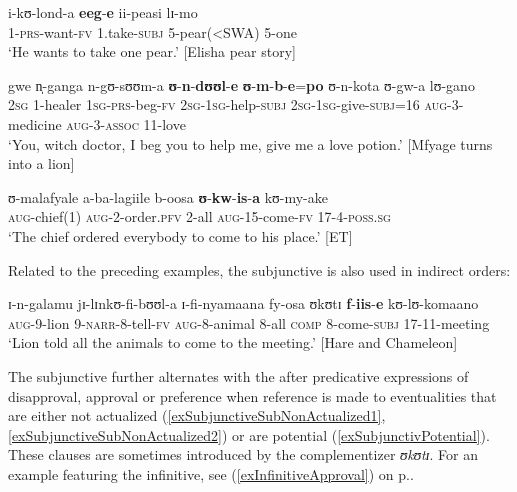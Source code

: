 \begin{exe}
\ex \label{exSubjunctiveModalitySameSubject}
\gll i-kʊ-lond-a \textbf{eeg}-\textbf{e} ii-peasi lɪ-mo\\
1-\textsc{prs}-want-\textsc{fv} 1.take-\textsc{subj} 5-pear(<SWA) 5-one\\
\glt \lq He wants to take one pear.' [Elisha pear story]

\largerpage
\ex \label{exSubjunctiveModalityDifferentSubject}
\gll gwe n̩-ganga n-gʊ-sʊʊm-a \textbf{ʊ}-\textbf{n}-\textbf{dʊʊl}-\textbf{e} \textbf{ʊ}-\textbf{m}-\textbf{b}-\textbf{e}=\textbf{po} ʊ-n-kota ʊ-gw-a lʊ-gano\\
\textsc{2sg} 1-healer \textsc{1sg}-\textsc{prs}-beg-\textsc{fv} \textsc{2sg}-\textsc{1sg}-help-\textsc{subj} \textsc{2sg}-\textsc{1sg}-give-\textsc{subj}=16 \textsc{aug}-3-medicine \textsc{aug}-3-\textsc{assoc} 11-love\\
\glt \lq You, witch doctor, I beg you to help me, give me a love potion.' [Mfyage turns into a lion] 

\ex \label{exInfinitiveModalityDifferentSubject}
\gll ʊ-malafyale a-ba-lagiile b-oosa \textbf{ʊ}-\textbf{kw}-\textbf{is}-\textbf{a} kʊ-my-ake\\
\textsc{aug}-chief(1) \textsc{aug}-2-order.\textsc{pfv} 2-all \textsc{aug}-15-come-\textsc{fv} 17-4-\textsc{poss.sg}\\
\glt \lq The chief ordered everybody to come to his place.' [ET]
\end{exe}

Related to the preceding examples, the subjunctive is also used in indirect orders:
\begin{exe}
\ex \gll ɪ-n-galamu jɪ-lɪnkʊ-fi-bʊʊl-a ɪ-fi-nyamaana fy-osa ʊkʊtɪ \textbf{f}-\textbf{iis}-\textbf{e} kʊ-lʊ-komaano\\
\textsc{aug}-9-lion 9-\textsc{narr}-8-tell-\textsc{fv} \textsc{aug}-8-animal 8-all \textsc{comp} 8-come-\textsc{subj} 17-11-meeting\\
\glt \lq Lion told all the animals to come to the meeting.' [Hare and Chameleon]
\end{exe}

The subjunctive further alternates with the  after predicative expressions of disapproval, approval or preference when reference is made to eventualities that are either not actualized (\ref{exSubjunctiveSubNonActualized1}, \ref{exSubjunctiveSubNonActualized2}) or are potential (\ref{exSubjunctivPotential}). These clauses are sometimes introduced by the complementizer \textit{ʊkʊtɪ}. For an example featuring the infinitive, see (\ref{exInfinitiveApproval}) on p.\nobreakspace\pageref{exInfinitiveApproval}.
 
